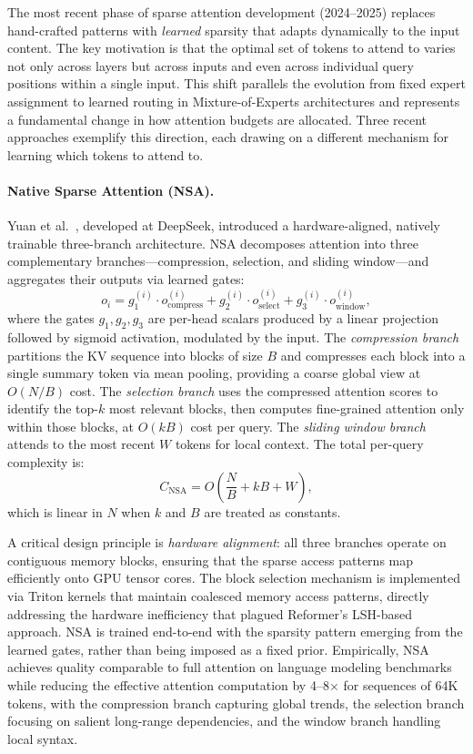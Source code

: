 The most recent phase of sparse attention development (2024--2025) replaces hand-crafted patterns with \emph{learned} sparsity that adapts dynamically to the input content. The key motivation is that the optimal set of tokens to attend to varies not only across layers but across inputs and even across individual query positions within a single input. This shift parallels the evolution from fixed expert assignment to learned routing in Mixture-of-Experts architectures and represents a fundamental change in how attention budgets are allocated. Three recent approaches exemplify this direction, each drawing on a different mechanism for learning which tokens to attend to.

\paragraph{Native Sparse Attention (NSA).}
Yuan et al.~\cite{yuan2025native}, developed at DeepSeek, introduced a hardware-aligned, natively trainable three-branch architecture. NSA decomposes attention into three complementary branches---compression, selection, and sliding window---and aggregates their outputs via learned gates:
\begin{equation}
o_i = g_1^{(i)} \cdot o_{\text{compress}}^{(i)} + g_2^{(i)} \cdot o_{\text{select}}^{(i)} + g_3^{(i)} \cdot o_{\text{window}}^{(i)},
\label{eq:nsa}
\end{equation}
where the gates $g_1, g_2, g_3$ are per-head scalars produced by a linear projection followed by sigmoid activation, modulated by the input. The \emph{compression branch} partitions the KV sequence into blocks of size $B$ and compresses each block into a single summary token via mean pooling, providing a coarse global view at $O(N/B)$ cost. The \emph{selection branch} uses the compressed attention scores to identify the top-$k$ most relevant blocks, then computes fine-grained attention only within those blocks, at $O(kB)$ cost per query. The \emph{sliding window branch} attends to the most recent $W$ tokens for local context. The total per-query complexity is:
\begin{equation}
C_{\text{NSA}} = O\!\left(\frac{N}{B} + kB + W\right),
\label{eq:nsa-complexity}
\end{equation}
which is linear in $N$ when $k$ and $B$ are treated as constants.

A critical design principle is \emph{hardware alignment}: all three branches operate on contiguous memory blocks, ensuring that the sparse access patterns map efficiently onto GPU tensor cores. The block selection mechanism is implemented via Triton kernels that maintain coalesced memory access patterns, directly addressing the hardware inefficiency that plagued Reformer's LSH-based approach. NSA is trained end-to-end with the sparsity pattern emerging from the learned gates, rather than being imposed as a fixed prior. Empirically, NSA achieves quality comparable to full attention on language modeling benchmarks while reducing the effective attention computation by 4--8$\times$ for sequences of 64K tokens, with the compression branch capturing global trends, the selection branch focusing on salient long-range dependencies, and the window branch handling local syntax.

